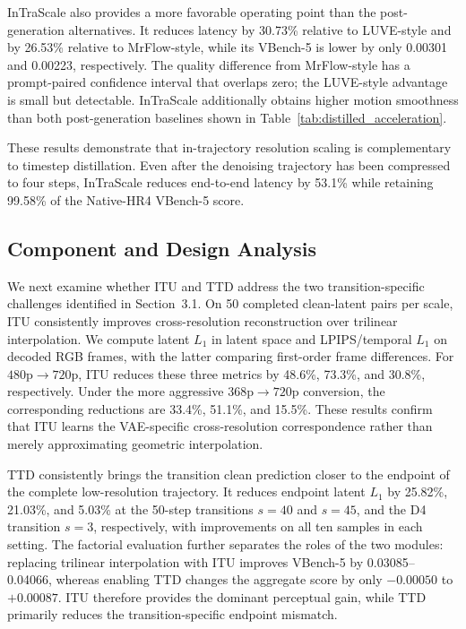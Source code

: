\documentclass[letterpaper]{article} %
\begin{document}
InTraScale also provides a more favorable operating point than the
post-generation alternatives. It reduces latency by 30.73\% relative to
LUVE-style and by 26.53\% relative to MrFlow-style, while its VBench-5 is lower
by only 0.00301 and 0.00223, respectively. The quality difference from
MrFlow-style has a prompt-paired confidence interval that overlaps zero; the
LUVE-style advantage is small but detectable. InTraScale additionally obtains
higher motion smoothness than both post-generation baselines shown in
Table~\ref{tab:distilled_acceleration}.

These results demonstrate that in-trajectory resolution scaling is
complementary to timestep distillation. Even after the denoising trajectory
has been compressed to four steps, InTraScale reduces
end-to-end latency by 53.1\% while retaining 99.58\% of the Native-HR4
VBench-5 score.

\subsection{Component and Design Analysis}
\label{sec:component_analysis}

We next examine whether ITU and TTD address the two transition-specific
challenges identified in Section~3.1. On 50 completed clean-latent pairs per scale, ITU consistently improves
cross-resolution reconstruction over trilinear interpolation. We compute latent
\(L_1\) in latent space and LPIPS/temporal \(L_1\) on decoded RGB frames, with
the latter comparing first-order frame differences. For
\(480\mathrm{p}\rightarrow720\mathrm{p}\), ITU reduces these three metrics by
48.6\%, 73.3\%, and 30.8\%, respectively. Under the more aggressive
\(368\mathrm{p}\rightarrow720\mathrm{p}\) conversion, the corresponding
reductions are 33.4\%, 51.1\%, and 15.5\%. These results confirm that ITU
learns the VAE-specific cross-resolution correspondence rather than merely
approximating geometric interpolation.

TTD consistently brings the transition clean prediction closer to the endpoint of the
complete low-resolution trajectory. It reduces endpoint latent \(L_1\) by
25.82\%, 21.03\%, and 5.03\% at the 50-step transitions \(s=40\) and
\(s=45\), and the D4 transition \(s=3\), respectively, with improvements on
all ten samples in each setting. The
factorial evaluation further separates the roles of the two modules:
replacing trilinear interpolation with ITU improves VBench-5 by
0.03085--0.04066, whereas enabling TTD changes the aggregate score by only
\(-0.00050\) to \(+0.00087\). ITU therefore provides the dominant perceptual
gain, while TTD primarily reduces the transition-specific endpoint mismatch.
\end{document}
